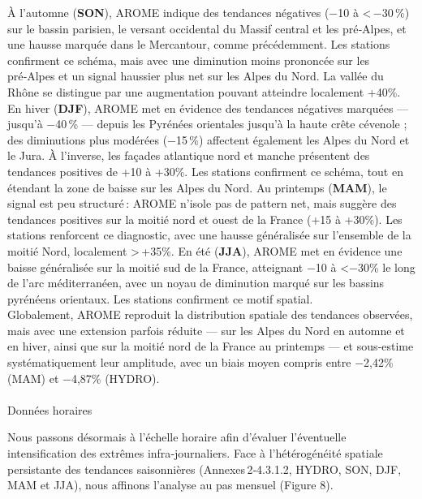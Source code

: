 \documentclass[
  article,
  nofooter,
  noheadings]{jss}
\makeatletter
\let\oldparagraph\paragraph
\renewcommand{\paragraph}{
    \@ifstar
      \xxxParagraphStar
      \xxxParagraphNoStar
  }
\newcommand{\xxxParagraphStar}[1]{\oldparagraph*{#1}\mbox{}}
\newcommand{\xxxParagraphNoStar}[1]{\oldparagraph{#1}\mbox{}}
\makeatother
\begin{document}
\hfill\break

À l'automne (\textbf{SON}), AROME indique des tendances négatives (−10 à
\textless\,−30\,\%) sur le bassin parisien, le versant occidental du
Massif central et les pré‑Alpes, et une hausse marquée dans le
Mercantour, comme précédemment. Les stations confirment ce schéma, mais
avec une diminution moins prononcée sur les pré‑Alpes et un signal
haussier plus net sur les Alpes du Nord. La vallée du Rhône se distingue
par une augmentation pouvant atteindre localement +40\%. En hiver
(\textbf{DJF}), AROME met en évidence des tendances négatives marquées
--- jusqu'à −40\,\% --- depuis les Pyrénées orientales jusqu'à la haute
crête cévenole ; des diminutions plus modérées (−15\,\%) affectent
également les Alpes du Nord et le Jura. À l'inverse, les façades
atlantique nord et manche présentent des tendances positives de +10 à
+30\%. Les stations confirment ce schéma, tout en étendant la zone de
baisse sur les Alpes du Nord. Au printemps (\textbf{MAM}), le signal est
peu structuré\,: AROME n'isole pas de pattern net, mais suggère des
tendances positives sur la moitié nord et ouest de la France (+15 à
+30\%). Les stations renforcent ce diagnostic, avec une hausse
généralisée sur l'ensemble de la moitié Nord, localement
\textgreater\,+35\%. En été (\textbf{JJA}), AROME met en évidence une
baisse généralisée sur la moitié sud de la France, atteignant −10 à
\textless−30\% le long de l'arc méditerranéen, avec un noyau de
diminution marqué sur les bassins pyrénéens orientaux. Les stations
confirment ce motif spatial.\\

Globalement, AROME reproduit la distribution spatiale des tendances
observées, mais avec une extension parfois réduite --- sur les Alpes du
Nord en automne et en hiver, ainsi que sur la moitié nord de la France
au printemps --- et sous‑estime systématiquement leur amplitude, avec un
biais moyen compris entre −2,42\% (MAM) et −4,87\% (HYDRO).

\paragraph{Données horaires}\label{donnuxe9es-horaires}

Nous passons désormais à l'échelle horaire afin d'évaluer l'éventuelle
intensification des extrêmes infra‑journaliers. Face à l'hétérogénéité
spatiale persistante des tendances saisonnières (Annexes\,2‑4.3.1.2,
HYDRO, SON, DJF, MAM et JJA), nous affinons l'analyse au pas mensuel
(Figure 8).
\end{document}
